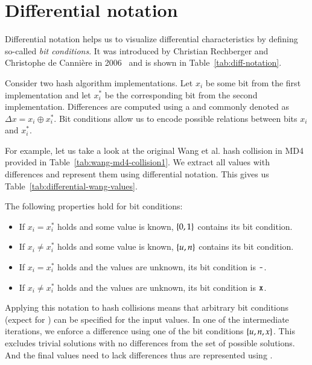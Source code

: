\section{Differential notation}
\label{sec:dc-notation}
%
Differential notation helps us to visualize differential characteristics
by defining so-called \emph{bit conditions}.
It was introduced by Christian Rechberger and Christophe de Canni\`ere
in 2006~\cite[Section 3.2]{char-2006} and is shown in Table~\ref{tab:diff-notation}.

Consider two hash algorithm implementations. Let $x_i$ be some bit
from the first implementation and let $x_i^*$ be the corresponding bit
from the second implementation. Differences are computed using a 
and commonly denoted as $\Delta x = x_i \oplus x_i^*$.
Bit conditions allow us to encode possible
relations between bits $x_i$ and $x_i^*$.

For example, let us take a look at the original Wang et al. hash collision
in MD4 provided in Table~\ref{tab:wang-md4-collision1}.
We extract all values with differences and represent them using differential notation.
This gives us Table~\ref{tab:differential-wang-values}.

The following properties hold for bit conditions:
\begin{itemize}[noitemsep,topsep=0pt]
  \item If $x_i = x_i^*$ holds and some value is known, $\left\{0,1\right\}$ contains its bit condition.
  \item If $x_i \neq x_i^*$ holds and some value is known, $\left\{u,n\right\}$ contains its bit condition.
  \item If $x_i = x_i^*$ holds and the values are unknown, its bit condition is $\texttt{-}$.
  \item If $x_i \neq x_i^*$ holds and the values are unknown, its bit condition is $\texttt{x}$.
\end{itemize}
Applying this notation to hash collisions means that arbitrary bit conditions
(expect for \dnI{\#}) can be specified for the input values. In one of the
intermediate iterations, we enforce a difference using one of the bit conditions
$\left\{u,n,x\right\}$. This excludes trivial solutions with no differences from the set of
possible solutions. And the final values need to lack differences thus are
represented using \dnI{-}.


